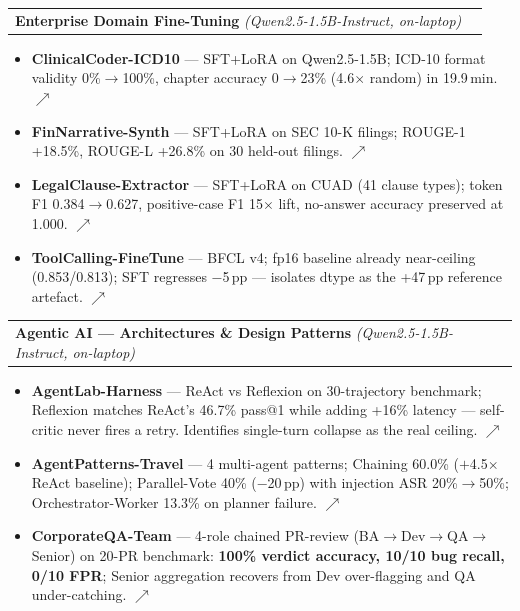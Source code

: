 \documentclass[letterpaper,11pt]{article}
\makeatletter
\newcommand{\resumeItem}[1]{
  \item\small{#1 \vspace{-2pt}}
}
\newcommand{\resumeProjectHeading}[2]{
  \item
    \begin{tabular*}{0.97\textwidth}{l@{\extracolsep{\fill}}r}
      \small#1 & #2 \\
    \end{tabular*}\vspace{-7pt}
}
\newcommand{\resumeItemListStart}{\begin{itemize}}
\newcommand{\resumeItemListEnd}{\end{itemize}\vspace{-5pt}}
\makeatother
\begin{document}
  \resumeProjectHeading
    {\textbf{Enterprise Domain Fine-Tuning} \emph{(Qwen2.5-1.5B-Instruct,
      on-laptop)}}{}
    \resumeItemListStart
      \resumeItem{\textbf{ClinicalCoder-ICD10} — SFT+LoRA on Qwen2.5-1.5B;
        ICD-10 format validity 0\%$\to$100\%, chapter accuracy 0$\to$23\%
        (4.6$\times$ random) in 19.9\,min.
        \href{https://github.com/ajaykumarsoma/ClinicalCoder-ICD10}{$\nearrow$}}
      \resumeItem{\textbf{FinNarrative-Synth} — SFT+LoRA on SEC 10-K filings;
        ROUGE-1 +18.5\%, ROUGE-L +26.8\% on 30 held-out filings.
        \href{https://github.com/ajaykumarsoma/FinNarrative-Synth}{$\nearrow$}}
      \resumeItem{\textbf{LegalClause-Extractor} — SFT+LoRA on CUAD (41
        clause types); token F1 0.384$\to$0.627, positive-case F1 15$\times$
        lift, no-answer accuracy preserved at 1.000.
        \href{https://github.com/ajaykumarsoma/LegalClause-Extractor}{$\nearrow$}}
      \resumeItem{\textbf{ToolCalling-FineTune} — BFCL v4; fp16 baseline
        already near-ceiling (0.853/0.813); SFT regresses $-$5\,pp
        — isolates dtype as the +47\,pp reference artefact.
        \href{https://github.com/ajaykumarsoma/ToolCalling-FineTune}{$\nearrow$}}
    \resumeItemListEnd

  \resumeProjectHeading
    {\textbf{Agentic AI --- Architectures \& Design Patterns} \emph{(Qwen2.5-1.5B-Instruct,
      on-laptop)}}{}
    \resumeItemListStart
      \resumeItem{\textbf{AgentLab-Harness} — ReAct vs Reflexion on
        30-trajectory benchmark; Reflexion matches ReAct's 46.7\% pass@1
        while adding +16\% latency — self-critic never fires a retry.
        Identifies single-turn collapse as the real ceiling.
        \href{https://github.com/ajaykumarsoma/AgenticAI/tree/main/AgentLab-Harness}{$\nearrow$}}
      \resumeItem{\textbf{AgentPatterns-Travel} — 4 multi-agent patterns;
        Chaining 60.0\% ($+$4.5$\times$ ReAct baseline); Parallel-Vote
        40\% ($-$20\,pp) with injection ASR 20\%$\to$50\%;
        Orchestrator-Worker 13.3\% on planner failure.
        \href{https://github.com/ajaykumarsoma/AgenticAI/tree/main/AgentPatterns-Travel}{$\nearrow$}}
      \resumeItem{\textbf{CorporateQA-Team} — 4-role chained PR-review
        (BA$\to$Dev$\to$QA$\to$Senior) on 20-PR benchmark:
        \textbf{100\% verdict accuracy, 10/10 bug recall, 0/10 FPR};
        Senior aggregation recovers from Dev over-flagging and QA
        under-catching.
        \href{https://github.com/ajaykumarsoma/AgenticAI/tree/main/CorporateQA-Team}{$\nearrow$}}
    \resumeItemListEnd
\end{document}
